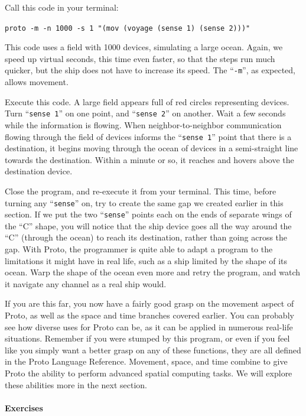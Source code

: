 \documentclass{article}
\newcommand\code[1]{\begin{center}\var{#1}\end{center}}
\newcommand\var[1]{{\tt #1}}
\newcommand\qvar[1]{``{\tt #1}''}
\begin{document}
Call this code in your terminal:

\code{proto -m -n 1000 -s 1 "(mov (voyage (sense 1) (sense 2)))"}

This code uses a field with 1000 devices, simulating a large
ocean.  Again, we speed up virtual seconds, this time even faster, so
that the steps run much quicker, but the ship does not have to
increase its speed.  The \qvar{-m}, as expected, allows movement.

Execute this code.  A large field appears full of red circles
representing devices.  Turn \qvar{sense 1} on one point, and
\qvar{sense 2} on another.  Wait a few seconds while the information
is flowing.  When neighbor-to-neighbor communication flowing through
the field of devices informs the \qvar{sense 1} point that there is a
destination, it begins moving through the ocean of devices in a
semi-straight line towards the destination.  Within a minute or so, it
reaches and hovers above the destination device.

Close the program, and re-execute it from your terminal.  This time, before
turning any \qvar{sense} on, try to create the same gap we created
earlier in this section.  If we put the two \qvar{sense} points each
on the ends of separate wings of the ``C'' shape, you will notice that
the ship device goes all the way around the ``C'' (through the ocean)
to reach its destination, rather than going across the gap.  With
Proto, the programmer is quite able to adapt a program to the
limitations it might have in real life, such as a ship limited by the
shape of its ocean.  Warp the shape of the ocean even more and retry
the program, and watch it navigate any channel as a real ship would.

If you are this far, you now have a fairly good grasp on the movement
aspect of Proto, as well as the space and time branches covered
earlier.  You can probably see how diverse uses for Proto can be, as
it can be applied in numerous real-life situations.  Remember if you
were stumped by this program, or even if you feel like you simply want
a better grasp on any of these functions, they are all defined in the
Proto Language Reference.  Movement, space, and time combine to give
Proto the ability to perform advanced spatial computing tasks.  We
will explore these abilities more in the next section.

\paragraph{Exercises}
\end{document}
